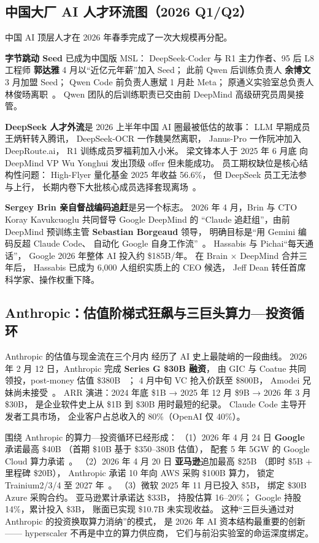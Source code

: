 \subsection{中国大厂 AI 人才环流图（2026 Q1/Q2）}

中国 AI 顶层人才在 2026 年春季完成了一次大规模再分配。

\textbf{字节跳动 Seed} 已成为中国版 MSL：
DeepSeek-Coder 与 R1 主力作者、95 后 L8 工程师 \textbf{郭达雅}
4 月以“近亿元年薪”加入 Seed；
此前 Qwen 后训练负责人 \textbf{余博文} 3 月加盟 Seed；
Qwen Code 前负责人惠斌 1 月赴 Meta；
原通义实验室总负责人林俊旸离职~\cite{deepseek_talent_outflow_2026}。
Qwen 团队的后训练职责已交由前 DeepMind 高级研究员周昊接管。

\textbf{DeepSeek 人才外流}是 2026 上半年中国 AI 圈最被低估的故事：
LLM 早期成员王炳轩转入腾讯，
DeepSeek-OCR 一作魏昊然离职，
Janus-Pro 一作阮冲加入 DeepRoute.ai，
R1 训练成员罗福莉加入小米。
梁文锋本人于 2025 年 6 月底
向 DeepMind VP Wu Yonghui 发出顶级 offer 但未能成功。
员工期权缺位是核心结构性问题：
High-Flyer 量化基金 2025 年收益 56.6\%，
但 DeepSeek 员工无法参与上行，
长期内卷下大批核心成员选择套现离场~\cite{deepseek_external_funding_2026}。

\textbf{Sergey Brin 亲自督战编码追赶}是另一个标志。
2026 年 4 月，Brin 与 CTO Koray Kavukcuoglu 共同督导 Google DeepMind 的
“Claude 追赶组”，由前 DeepMind 预训练主管
\textbf{Sebastian Borgeaud} 领导，
明确目标是“用 Gemini 编码反超 Claude Code、
自动化 Google 自身工作流”~\cite{brin_claude_taskforce_2026}。
Hassabis 与 Pichai“每天通话”，
Google 2026 年整体 AI 投入约 \$185B/年。
在 Brain $\times$ DeepMind 合并三年后，
Hassabis 已成为 6,000 人组织实质上的 CEO 候选，
Jeff Dean 转任首席科学家、操作权重下降。

\subsection{Anthropic：估值阶梯式狂飙与三巨头算力—投资循环}

Anthropic 的估值与现金流在三个月内
经历了 AI 史上最陡峭的一段曲线。
2026 年 2 月 12 日，Anthropic 完成 \textbf{Series G \$30B 融资}，
由 GIC 与 Coatue 共同领投，post-money 估值 \$380B%
~\cite{anthropic_seriesg_2026}；
4 月中旬 VC 抢入价跃至 \$800B，
Amodei 兄妹尚未接受~\cite{anthropic_800b_valuation_2026}。
ARR 演进：2024 年底 \$1B → 2025 年 12 月 \$9B
→ 2026 年 3 月 \$30B，
是企业软件史上从 \$1B 到 \$30B 用时最短的纪录。
Claude Code 主导开发者工具市场，
企业客户占总收入的 80\%（OpenAI 仅 40\%）。

围绕 Anthropic 的算力—投资循环已经形成：
（1）2026 年 4 月 24 日 \textbf{Google} 承诺最高 \$40B
（首期 \$10B 基于 \$350--380B 估值），
配套 5 年 5GW 的 Google Cloud 算力承诺~\cite{google_anthropic_40b_2026}。
（2）2026 年 4 月 20 日 \textbf{亚马逊}追加最高 \$25B
（即时 \$5B + 里程碑 \$20B），
Anthropic 承诺 10 年向 AWS 采购 \$100B 算力，
锁定 Trainium2/3/4 至 2027 年~\cite{aws_anthropic_25b_2026}。
（3）微软 2025 年 11 月已投入 \$5B，
绑定 \$30B Azure 采购合约。
亚马逊累计承诺达 \$33B，
持股估算 16--20\%；
Google 持股 14\%，累计投入 \$3B，
账面已实现 \$10.7B 未实现收益。
这种“三巨头通过对 Anthropic 的投资换取算力消纳”的模式，
是 2026 年 AI 资本结构最重要的创新——
hyperscaler 不再是中立的算力供应商，
它们与前沿实验室的命运深度绑定。

